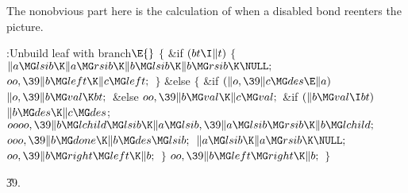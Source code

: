 The nonobvious part here is the calculation of  when a
disabled bond reenters the picture.

\Y\B\4:Unbuild leaf with branch\X${}\E{}$\6
${}\{{}$\1\6
\&{if} ${}(\\{bt}\I\|t){}$\5
${}\{{}$\1\6
${}\|a\MG\\{lsib}\K\|a\MG\\{rsib}\K\|b\MG\\{lsib}\K\|b\MG\\{rsib}\K\NULL;{}$\6
${}\\{oo},\39\|b\MG\\{left}\K\|c\MG\\{left};{}$\6
\4${}\}{}$\5
\2\&{else}\5
${}\{{}$\1\6
\&{if} ${}(\|o,\39\|c\MG\\{des}\E\|a){}$\1\5
${}\|o,\39\|b\MG\\{val}\K\\{bt};{}$\2\6
\&{else}\1\5
${}\\{oo},\39\|b\MG\\{val}\K\|c\MG\\{val};{}$\2\6
\&{if} ${}(\|b\MG\\{val}\I\\{bt}){}$\1\5
${}\|b\MG\\{des}\K\|c\MG\\{des}{}$;\2\6
${}\\{oooo},\39\|b\MG\\{lchild}\MG\\{lsib}\K\|a\MG\\{lsib},\39\|a\MG\\{lsib}\MG%
\\{rsib}\K\|b\MG\\{lchild};{}$\6
${}\\{ooo},\39\|b\MG\\{done}\K\|b\MG\\{des}\MG\\{lsib};{}$\6
${}\|a\MG\\{lsib}\K\|a\MG\\{rsib}\K\NULL;{}$\6
${}\\{oo},\39\|b\MG\\{right}\MG\\{left}\K\|b;{}$\6
\4${}\}{}$\2\6
${}\\{oo},\39\|b\MG\\{left}\MG\\{right}\K\|b;{}$\6
\4${}\}{}$\2\par
\U39.\fi

